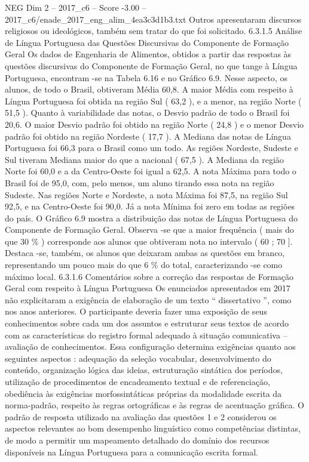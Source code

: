 \begin{textsample}{NEG Dim 2 – 2017\_c6 – Score -3.00 – 2017\_c6/enade\_2017\_eng\_alim\_4ea3c3d1b3.txt}
Outros apresentaram discursos religiosos ou ideológicos, também sem tratar do que foi solicitado. 6.3.1.5 Análise de Língua Portuguesa das Questões Discursivas do Componente de Formação Geral Os dados de Engenharia de Alimentos, obtidos a partir das respostas às questões discursivas do Componente de Formação Geral, no que tange à Língua Portuguesa, encontram -se na Tabela 6.16 e no Gráfico 6.9.
Nesse aspecto, os alunos, de todo o Brasil, obtiveram Média 60,8.
A maior Média com respeito à Língua Portuguesa foi obtida na região Sul ( 63,2 ), e a menor, na região Norte ( 51,5 ).
Quanto à variabilidade das notas, o Desvio padrão de todo o Brasil foi 20,6.
O maior Desvio padrão foi obtido na região Norte ( 24,8 ) e o menor Desvio padrão foi obtido na região Nordeste ( 17,7 ).
A Mediana das notas de Língua Portuguesa foi 66,3 para o Brasil como um todo.
As regiões Nordeste, Sudeste e Sul tiveram Mediana maior do que a nacional ( 67,5 ).
A Mediana da região Norte foi 60,0 e a da Centro-Oeste foi igual a 62,5.
A nota Máxima para todo o Brasil foi de 95,0, com, pelo menos, um aluno tirando essa nota na região Sudeste.
Nas regiões Norte e Nordeste, a nota Máxima foi 87,5, na região Sul 92,5, e na Centro-Oeste foi 90,0.
Já a nota Mínima foi zero em todas as regiões do país.
O Gráfico 6.9 mostra a distribuição das notas de Língua Portuguesa do Componente de Formação Geral.
Observa -se que a maior frequência ( mais do que 30 \% ) corresponde aos alunos que obtiveram nota no intervalo ( 60 ; 70 ].
Destaca -se, também, os alunos que deixaram ambas as questões em branco, representando um pouco mais do que 6 \% do total, caracterizando -se como máximo local. 6.3.1.6 Comentários sobre a correção das respostas de Formação Geral com respeito à Língua Portuguesa Os enunciados apresentados em 2017 não explicitaram a exigência de elaboração de um texto “ dissertativo ”, como nos anos anteriores.
O participante deveria fazer uma exposição de seus conhecimentos sobre cada um dos assuntos e estruturar seus textos de acordo com as características do registro formal adequado à situação comunicativa – avaliação de conhecimentos.
Essa configuração determina exigências quanto aos seguintes aspectos : adequação da seleção vocabular, desenvolvimento do conteúdo, organização lógica das ideias, estruturação sintática dos períodos, utilização de procedimentos de encadeamento textual e de referenciação, obediência às exigências morfossintáticas próprias da modalidade escrita da norma-padrão, respeito às regras ortográficas e às regras de acentuação gráfica.
O padrão de resposta utilizado na avaliação das questões 1 e 2 considerou os aspectos relevantes ao bom desempenho linguístico como competências distintas, de modo a permitir um mapeamento detalhado do domínio dos recursos disponíveis na Língua Portuguesa para a comunicação escrita formal.

\end{textsample}
